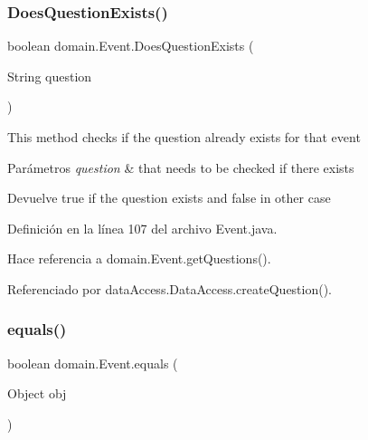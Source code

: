 \subsubsection{\texorpdfstring{DoesQuestionExists()}{DoesQuestionExists()}}
{\footnotesize\ttfamily boolean domain.\+Event.\+Does\+Question\+Exists (\begin{DoxyParamCaption}\item[{String}]{question }\end{DoxyParamCaption})}

This method checks if the question already exists for that event


\begin{DoxyParams}{Parámetros}
{\em question} & that needs to be checked if there exists \\
\hline
\end{DoxyParams}
\begin{DoxyReturn}{Devuelve}
true if the question exists and false in other case 
\end{DoxyReturn}


Definición en la línea 107 del archivo Event.\+java.


\begin{DoxyCode}{0}

\end{DoxyCode}


Hace referencia a domain.\+Event.\+get\+Questions().



Referenciado por data\+Access.\+Data\+Access.\+create\+Question().

\mbox{\label{classdomain_1_1Event_aeb56c0c6301d176e3f861ae04f50fab7}} 
\subsubsection{\texorpdfstring{equals()}{equals()}}
{\footnotesize\ttfamily boolean domain.\+Event.\+equals (\begin{DoxyParamCaption}\item[{Object}]{obj }\end{DoxyParamCaption})}




